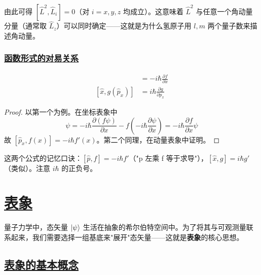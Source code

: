 \begin{remark}
    由此可得 $[\hat{L}^2, \hat{L}_i] = 0$（对 $i = x, y, z$ 均成立）。这意味着 $\hat{L}^2$ 与任意一个角动量分量（通常取 $\hat{L}_z$）可以同时确定——这就是为什么氢原子用 $l, m$ 两个量子数来描述角动量。
\end{remark}

\subsubsection{\protect\hyperlink{:}{函数形式的对易关系}}

\begin{theorem}[与函数的对易关系]
    \begin{align}
        [\hat{p}_x, f(\hat{x})] &= -i\hbar\frac{\partial f}{\partial x} \\
        [\hat{x}, g(\hat{p}_x)] &= i\hbar\frac{\partial g}{\partial p_x}
    \end{align}
\end{theorem}

\begin{proof}
    以第一个为例。在坐标表象中
    \begin{equation}
        [\hat{p}_x, f(x)]\psi = -i\hbar\frac{\partial(f\psi)}{\partial x} - f(-i\hbar\frac{\partial\psi}{\partial x}) = -i\hbar\frac{\partial f}{\partial x}\psi
    \end{equation}
    故 $[\hat{p}_x, f(x)] = -i\hbar f'(x)$。第二个同理，在动量表象中证明。
\end{proof}

\begin{remark}
    这两个公式的记忆口诀：$[\hat{p}, f] = -i\hbar f'$（"p 左乘 f 等于求导"），$[\hat{x}, g] = i\hbar g'$（类似）。注意 $i\hbar$ 的正负号。
\end{remark}







\section{\protect\hyperlink{:}{表象}}

量子力学中，态矢量 $\ket{\psi}$ 生活在抽象的希尔伯特空间中。为了将其与可观测量联系起来，我们需要选择一组基底来"展开"态矢量——这就是\textbf{表象}的核心思想。

\subsection{\protect\hyperlink{:}{表象的基本概念}}

